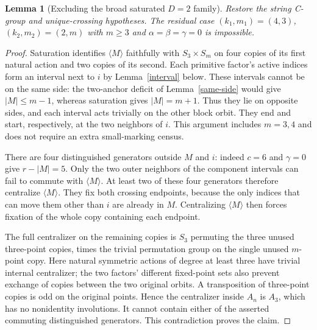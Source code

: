 \documentclass[11pt,a4paper]{article}
\newtheorem{lemma}{Lemma}
\newcommand{\gen}[1]{\langle#1\rangle}
\begin{document}
\begin{lemma}[Excluding the broad saturated $D=2$ family]
Restore the string C-group and unique-crossing hypotheses.
The residual case $(k_1,m_1)=(4,3)$, $(k_2,m_2)=(2,m)$
with $m\geq3$ and $\alpha=\beta=\gamma=0$ is impossible.
\end{lemma}
\begin{proof}
Saturation identifies $\gen M$ faithfully with $S_3\times S_m$
on four copies of its first natural action and two copies of
its second. Each primitive factor's active indices form an
interval next to $i$ by Lemma~\ref{interval} below. These
intervals cannot be on the same side: the two-anchor deficit
of Lemma~\ref{same-side} would give $|M|\leq m-1$, whereas
saturation gives $|M|=m+1$. Thus they lie on opposite sides,
and each interval acts trivially on the other block orbit.
They end and start, respectively, at the two neighbors of $i$.
This argument includes $m=3,4$ and does not require an extra
small-marking census.

There are four distinguished generators outside $M$ and $i$:
indeed $c=6$ and $\gamma=0$ give $r-|M|=5$. Only the two
outer neighbors of the component intervals can fail to commute
with $\gen M$. At least two of these four generators therefore
centralize $\gen M$. They fix both crossing endpoints, because
the only indices that can move them other than $i$ are already
in $M$. Centralizing $\gen M$ then forces fixation of the whole
copy containing each endpoint.

The full centralizer on the remaining copies is $S_3$ permuting
the three unused three-point copies, times the trivial permutation
group on the single unused $m$-point copy. Here natural symmetric
actions of degree at least three have trivial internal centralizer;
the two factors' different fixed-point sets also prevent exchange
of copies between the two original orbits. A transposition of
three-point copies is odd on the original points. Hence the
centralizer inside $A_n$ is $A_3$, which has no nonidentity
involutions. It cannot contain either of the asserted commuting
distinguished generators. This contradiction proves the claim.
\end{proof}
\end{document}
